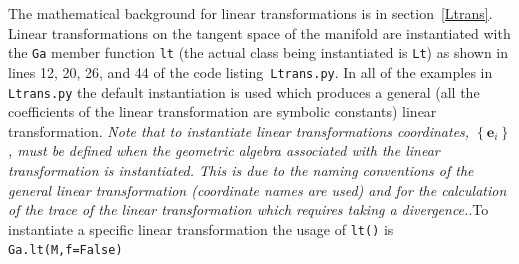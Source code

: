 \documentclass[12pt]{report}
\newcommand{\bm}[1]{\boldsymbol{#1}}
\newcommand{\lbrc}{\left \{}
\newcommand{\rbrc}{\right \}}
\newcommand{\set}[1]{\lbrc {#1} \rbrc}
\newcommand{\T}[1]{\texttt{#1}}
\begin{document}
The mathematical background for linear transformations is in section~\ref{Ltrans}.  Linear transformations on the tangent space of
the manifold are instantiated with the \T{Ga} member function \T{lt} (the actual class being instantiated is \T{Lt}) as shown in
 lines 12, 20, 26, and 44 of the
code listing~\T{Ltrans.py}. In all of the examples in \T{Ltrans.py} the default instantiation is used which produces a general (all the
coefficients of the linear transformation are symbolic constants) linear transformation. \emph{Note that to instantiate linear transformations
coordinates, $\set{\bm{e}_{i}}$, must be defined when the geometric algebra associated with the linear transformation is instantiated.
This is due to the naming conventions of the general linear transformation (coordinate names are used) and for the calculation
of the trace of the linear transformation which requires taking a divergence.}.To instantiate a specific linear transformation
the usage of \T{lt()} is
\T{Ga.lt(M,f=False)}
\end{document}
